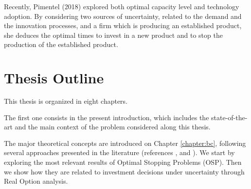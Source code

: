 Recently, Pimentel (2018) \cite{rita} explored both optimal capacity level and technology adoption. By considering two sources of uncertainty, related to the demand and the innovation processes,
and a firm which is producing an established product, she deduces the optimal times to invest in a new product and to stop the production of the established product. 







\section{Thesis Outline}
\label{section:outline}


This thesis is organized in eight chapters.

The first one consists in the present introduction, which includes the state-of-the-art and the main context of the problem considered along this thesis.



The major theoretical concepts are introduced on Chapter \ref{chapter:bc}, following several approaches presented in the literature (references \cite{dixit:book}, \cite{ross} and \cite{oksendal:book}).
We start by exploring the most relevant results of Optimal Stopping Problems (OSP). Then we show how they are related to investment decisions under uncertainty through Real Option analysis.

